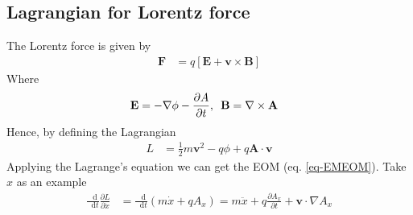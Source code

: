 \documentclass[twoside,9pt]{article}
\numberwithin{equation}{section} %
\renewcommand*\d{\mathop{}\!\mathrm{d}}
\theoremstyle{definition}
\theoremstyle{remark}
\begin{document}
\subsection{Lagrangian for Lorentz force}
The Lorentz force is given by
\begin{align}
    \mathbf{F} &= 
    q[\mathbf{E} + \mathbf{v}\times\mathbf{B}]
    \label{eq-EMEOM}
\end{align}
Where
\begin{align}
    \mathbf{E} &= -\nabla\phi - \frac{\partial A}{\partial t},\enskip
    \mathbf{B} = \nabla\times\mathbf{A}
\end{align}
Hence, by defining the Lagrangian
\begin{align}
    L &= 
    \frac{1}{2}m\mathbf{v}^2 - q\phi + q\mathbf{A}\cdot\mathbf{v}
\end{align}
Applying the Lagrange's equation we can get the EOM (eq. \ref{eq-EMEOM}).
Take $x$ as an example
\begin{align}
    \frac{\d}{\d t}\frac{\partial L}{\partial \dot x}
    &= \frac{\d}{\d t}(m\dot x + qA_x)
    = m\ddot x + q\frac{\partial A_x}{\partial t} + \mathbf{v}\cdot\nabla A_x
\end{align}
\end{document}
